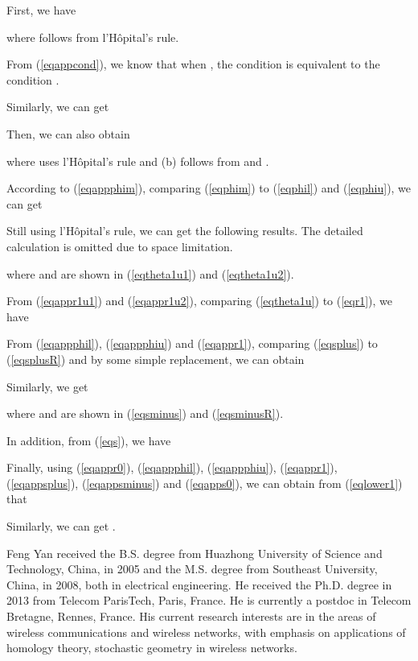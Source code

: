 \documentclass[journal, twoside]{IEEEtran}
\begin{document}
\begin{IEEEproof} First, we have 

\noindent where  follows from l'H\^{o}pital's rule.

From (\ref{eqappcond}), we know that when , the condition  is equivalent to the condition .

Similarly, we can get 


Then, we can also obtain

\noindent where  uses l'H\^{o}pital's rule and (b) follows from  and .

According to (\ref{eqappphim}), comparing (\ref{eqphim}) to (\ref{eqphil}) and (\ref{eqphiu}), we can get 


Still using l'H\^{o}pital's rule, we can get the following results. The detailed calculation is omitted due to space limitation.

\noindent where  and  are shown in (\ref{eqtheta1u1}) and (\ref{eqtheta1u2}).

From (\ref{eqappr1u1}) and (\ref{eqappr1u2}), comparing (\ref{eqtheta1u}) to (\ref{eqr1}), we have


From (\ref{eqappphil}), (\ref{eqappphiu}) and (\ref{eqappr1}), comparing (\ref{eqsplus}) to (\ref{eqsplusR}) and by some simple replacement, we can obtain


Similarly, we get

\noindent where  and 
are shown in (\ref{eqsminus}) and (\ref{eqsminusR}).

In addition, from (\ref{eqs}), we have 


Finally, using (\ref{eqappr0}), (\ref{eqappphil}), (\ref{eqappphiu}), (\ref{eqappr1}), (\ref{eqappsplus}), (\ref{eqappsminus}) and (\ref{eqapps0}), we can obtain from (\ref{eqlower1}) that
	
	Similarly, we can get .

\end{IEEEproof}









\ifCLASSOPTIONcaptionsoff
  \newpage
\fi















\begin{IEEEbiography}{Feng Yan}
received the B.S. degree from Huazhong University of Science and 
Technology, China, in 2005 and the M.S. degree from Southeast 
University, China, in 2008, both in electrical engineering. He 
received the Ph.D. degree in 2013 from Telecom ParisTech, Paris, France. He
is currently a postdoc in Telecom Bretagne, Rennes, France. His 
current research interests are in the areas of wireless 
communications and wireless networks, with emphasis on applications 
of homology theory, stochastic geometry in wireless networks.
\end{IEEEbiography}
\end{document}
